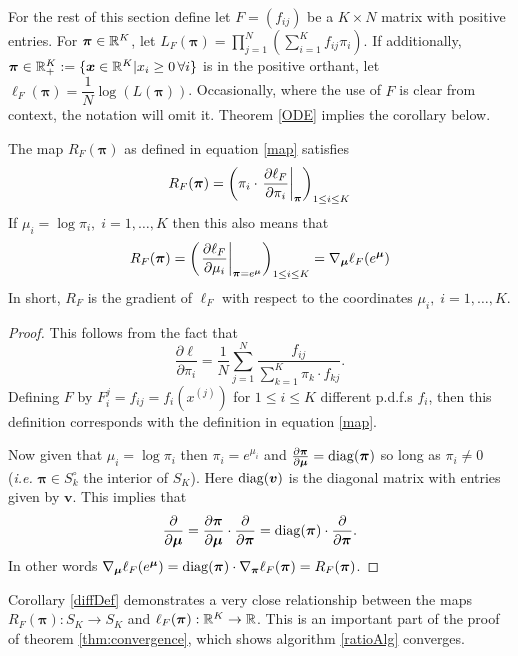 \label{sect:convergence}
For the rest of this section define let $F=(f_{ij})$ be a $K\times N$ matrix with positive entries.  For $\bm\pi\in\mathbb R^K$, let $L_F(\bm\pi)=\prod_{j=1}^{N}\left(\sum_{i=1}^{K}f_{ij}\pi_{i}\right)$. If additionally, $\bm\pi\in\mathbb R_+^K\mathrel{\mathop{:}}=\{\bm x\in\mathbb R^K|x_i\geq 0\,\forall i\}$ is in the positive orthant, 
let $\ell_F(\bm\pi)={\dfrac{1}{N}}\log(L(\bm\pi))$. Occasionally, where the use of \( F \) is clear from context, the notation will omit it. Theorem \ref{ODE} implies the corollary below.

\begin{cor}\label{diffDef}
 The map $R_F(\bm\pi)$ as defined in equation \eqref{map} satisfies
\[R_F(\bm\pi)=\left(\pi_i\cdot\eval{\frac{\partial\ell_F}{\partial\pi_i}}_{\bm\pi}\right)_{1\leq i\leq K}\]
If \( \mu_i = \log \pi_i,\; i=1,\ldots,K\) then this also means that 
\begin{equation}\label{eqn:RGrad}
R_F(\bm\pi) = \left(\eval{\pdv{\ell_F}{\mu_i}}_{\bm\pi = e^{\bm\mu}}\right)_{1\leq i\leq K} = \nabla_{\bm \mu}\elpi[e^{\bm\mu}]{F}
\end{equation}
In short, \( R_F \) is the gradient of \( \ell_F \) with respect to the coordinates \( \mu_i,\; i=1,\ldots,K  \).
\end{cor}
\begin{proof}
This follows from the fact that 
\[\frac{\partial\ell}{\partial\pi_i}=\frac 1N\sum_{j=1}^{N}\frac{f_{ij}}{\sum_{k=1}^{K}\pi_k\cdot f_{kj}}.\]
Defining \( F \) by $ F^j_i = f_{ij}=f_{i}(x^{(j)})$ for $1\leq i\leq K$ different p.d.f.s $f_i$, then this definition corresponds with the definition in equation \eqref{map}.

Now given that \( \mu_i = \log \pi_i \) then \( \pi_i = e^{\mu_i} \) and \( \pdv{\bm\pi}{\bm\mu} = \operatorname{diag}(\bm\pi) \) so long as \( \pi_i \neq 0 \) (\textit{i.e.} \( \bm\pi\in S_k^{\circ} \) the interior of \( S_K \)). Here $\operatorname{diag}(\bm v)$ is the diagonal matrix with entries given by $\bm v$. This implies that 
\[ \pdv{\bm\mu} =  \pdv{\bm\pi}{\bm\mu}\cdot\pdv{\bm\pi} = \operatorname*{diag}(\bm\pi)\cdot\pdv{\bm\pi}. \]
	In other words \( \nabla_{\bm\mu}\ell_F(e^{\bm\mu}) = \operatorname*{diag}(\bm\pi)\cdot\nabla_{\bm\pi}\ell_{F}(\bm\pi) = R_F(\bm\pi)\).
\end{proof}

Corollary \ref{diffDef} demonstrates a very close relationship between the maps $R_F(\bm\pi):S_K\rightarrow S_K$ and $\ell_F(\bm\pi):\mathbb R^K\rightarrow \mathbb R$. This is an important part of the proof of theorem \ref{thm:convergence}, which shows algorithm \ref{ratioAlg} converges.  

